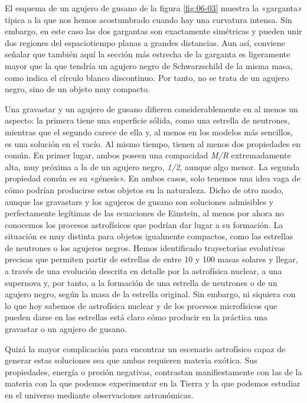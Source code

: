El esquema de un agujero de gusano de la figura \ref{fig:06-03} muestra la «garganta» típica a la que nos hemos acostumbrado cuando hay una curvatura intensa. Sin embargo, en este caso las dos gargantas son exactamente simétricas y pueden unir dos regiones del espaciotiempo planas a grandes distancias. Aun así, conviene señalar que también aquí la sección más estrecha de la garganta es ligeramente mayor que la que tendría un agujero negro de Schwarzschild de la misma masa, como indica el círculo blanco discontinuo. Por tanto, no se trata de un agujero negro, sino de un objeto muy compacto.

Una gravastar y un agujero de gusano difieren considerablemente en al menos un aspecto: la primera tiene una superficie sólida, como una estrella de neutrones, mientras que el segundo carece de ella y, al menos en los modelos más sencillos, es una solución en el vacío. Al mismo tiempo, tienen al menos dos propiedades en común. En primer lugar, ambos poseen una compacidad \emph{M/R} extremadamente alta, muy próxima a la de un agujero negro, \emph{1/2}, aunque algo menor. La segunda propiedad común es su «génesis». En ambos casos, solo tenemos una idea vaga de cómo podrían producirse estos objetos en la naturaleza. Dicho de otro modo, aunque las gravastars y los agujeros de gusano son soluciones admisibles y perfectamente legítimas de las ecuaciones de Einstein, al menos por ahora no conocemos los procesos astrofísicos que podrían dar lugar a su formación. La situación es muy distinta para objetos igualmente compactos, como las estrellas de neutrones o los agujeros negros. Hemos identificado trayectorias evolutivas precisas que permiten partir de estrellas de entre 10 y 100 masas solares y llegar, a través de una evolución descrita en detalle por la astrofísica nuclear, a una supernova y, por tanto, a la formación de una estrella de neutrones o de un agujero negro, según la masa de la estrella original. Sin embargo, ni siquiera con lo que hoy sabemos de astrofísica nuclear y de los procesos microfísicos que pueden darse en las estrellas está claro cómo producir en la práctica una gravastar o un agujero de gusano.

Quizá la mayor complicación para encontrar un escenario astrofísico capaz de generar estas soluciones sea que ambas requieren materia exótica. Sus propiedades, energía o presión negativas, contrastan manifiestamente con las de la materia con la que podemos experimentar en la Tierra y la que podemos estudiar en el universo mediante observaciones astronómicas.


